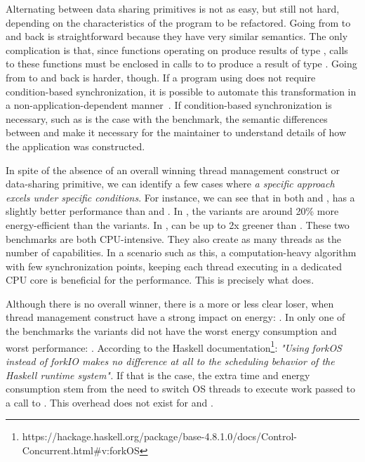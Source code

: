 Alternating between data sharing primitives is not as easy, but still not hard, depending on the characteristics of the program to be refactored. Going from \MVar to \TMVar and back is straightforward because they have very similar semantics. The only complication is that, since functions operating on \TMVar produce results of type \STM, calls to these functions must be enclosed in calls to \atomically to produce a result of type \IO. Going from \MVar to \TVar and back is harder, though. If a program using \MVar does not require condition-based synchronization, it is possible to automate this transformation in a non-application-dependent manner~\cite{soares-neto:2014}. If condition-based synchronization is necessary, such as is the case with the \dining benchmark, the semantic differences between \TVar and \MVar make it necessary for the maintainer to understand details of how the application was constructed.

In spite of the absence of an overall winning thread management construct or data-sharing primitive, we can identify a few cases where {\em a specific approach excels under specific conditions}. For instance, we can see that in both \mandelbrot and \spectral, \forkOn has a slightly better performance than \forkIO and \forkOS. In \mandelbrot, the \forkOn variants are around 20\% more energy-efficient than the \forkIO variants. In \spectral, \forkOn can be up to 2x greener than \forkOS. These two benchmarks are both CPU-intensive. They also create as many threads as the number of capabilities. In a scenario such as this, a computation-heavy algorithm with few synchronization points, keeping each thread executing in a dedicated CPU core is beneficial for the performance. This is precisely what \forkOn does.

Although there is no overall winner, there is a more or less clear loser, when thread management construct have a strong impact on energy: \forkOS. In only one of the benchmarks the \forkOS variants did not have the worst energy consumption and worst performance: \regex. According to the Haskell documentation\footnote{https://hackage.haskell.org/package/base-4.8.1.0/docs/Control-Concurrent.html\#v:forkOS}: \emph{"Using forkOS instead of forkIO makes no difference at all to the scheduling behavior of the Haskell runtime system".} If that is the case, the extra time and energy consumption stem from the need to switch OS threads to execute work passed to a call to \forkOS. This overhead does not exist for \forkOn and \forkIO.


